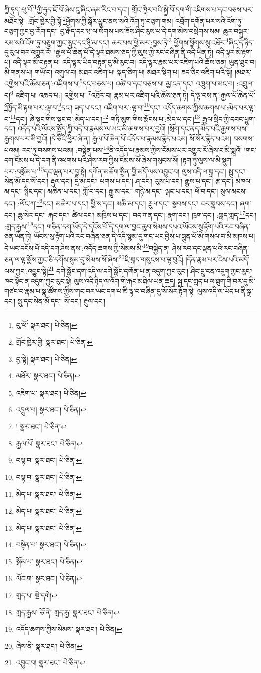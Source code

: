 ཀྱི་ཧུད་:ཕུ་བོ་\footnote{བུ་ཕོ་  སྣར་ཐང་།  པེ་ཅིན། }ཀྱི་ཧུད་ཇོ་བོ་ཞེས་ངུ་ཞིང་ཞམ་རིང་བ་དང་། གྲོང་ཁྱེར་བའི་སྐྱེ་བོ་དག་གི་འཇིགས་པ་དང་བཅས་པར་མཐོང་སྟེ། :གྲོང་ཁྱེར་གྱི་ལྷོ་\footnote{གྲོང་ཁྱེར་གྱི་  སྣར་ཐང་།  པེ་ཅིན། }ཕྱོགས་ཀྱི་སྒོར་ཕྱུང་ནས་སའི་འོག་ཏུ་བཅུག་གམ། འབྲོག་དགོན་པར་སའི་འོག་ཏུ་བཅུག་ཀྱང་བྱ་རོག་དང་། བྱ་རྒོད་དང་ཝ་ལ་སོགས་པས་ཟོས་ཤིང་རུས་པ་དེ་དག་མེས་བསྲེགས་སམ། ཆུར་བསྐུར་རམ་སའི་འོག་ཏུ་བཅུག་ཀྱང་རླུང་དང་ཉི་མ་དང་། ཆར་པས་ཕྱེ་མར་:བྱས་ཏེ།\footnote{བྱ་སྟེ།  སྣར་ཐང་།  པེ་ཅིན། } ཕྱོགས་ཕྱོགས་སུ་འཐོར་\footnote{མཐོར་  སྣར་ཐང་།  པེ་ཅིན། }ཞིང་དེ་ཉིད་དུ་རུལ་བར་འགྱུར་རོ། །རྒྱལ་པོ་ཆེན་པོ་དེ་ལྟར་ཐམས་ཅད་ཀྱི་ལུས་ཀྱི་རང་བཞིན་ནི་འདི་ཡིན་ཏེ། འདི་ལྟར་མི་རྟག་པ། འདི་ལྟར་མི་བརྟན་པ། འདི་ལྟར་ཡིད་བརྟན་དུ་མི་རུང་བ། འདི་ལྟར་རྣམ་པར་འཇིག་པའི་ཆོས་ཅན། ཡུན་ཐུང་བ། མི་གནས་པ། གཡོ་བ། འགུལ་བ། མཐར་འཇིག་པ། སྐད་ཅིག་པ། མཐར་སྡིག་པ། ཟད་ཅིང་འཇིག་པའི་སྒོ། །མཐར་འགྱེས་པའི་ཆོས་ཅན་:འཇིགས་པ་\footnote{འཇིག་པ་  སྣར་ཐང་།  པེ་ཅིན། }དང་བཅས་པ། འཚེ་བ་དང་བཅས་པ། མྱ་ངན་དང་། འཁྲུག་པ་མང་བ། :འབྲུལ་བ།\footnote{འདྲུལ་པ།  སྣར་ཐང་།  པེ་ཅིན། } འཇིག་པ། འཆད་པ:། འགྱེས་པ། \footnote{།    སྣར་ཐང་།  པེ་ཅིན། }འཐོར་བ། རྣམ་པར་འཇིག་པའི་ཆོས་ཅན་ཏེ། དེ་ལྟ་བས་ན་:རྒྱལ་པོ་ཆེན་པོ་\footnote{རྒྱལ་པོ་  སྣར་ཐང་།  པེ་ཅིན། }ཁྱོད་མི་རྟག་པར་:ལྟ་བ་\footnote{བལྟ་བ་  སྣར་ཐང་།  པེ་ཅིན། }དང་། ཟད་པ་དང་། འཇིག་པར་:ལྟ་བ་\footnote{བལྟ་བ་  སྣར་ཐང་།  པེ་ཅིན། }དང་། འདོད་ཆགས་ཀྱིས་ཆགས་པ་:མེད་པར་ལྟ་བ་\footnote{མེད་པ་  སྣར་ཐང་།  པེ་ཅིན། }དང་། ཞེ་སྡང་གིས་སྡང་བ་:མེད་པ་དང་།\footnote{མེད་པ།  སྣར་ཐང་།  པེ་ཅིན། } གཏི་མུག་གིས་རྨོངས་པ་:མེད་པ་དང་།\footnote{མེད་པ།  སྣར་ཐང་།  པེ་ཅིན། } རྒྱལ་སྲིད་ཀྱི་དབང་ཕྱུག་དང་། འདོད་པའི་ལོངས་སྤྱོད་ཀྱི་བདེ་བ་རྣམས་ལ་ཡང་མི་ཆགས་པར་བྱའོ། །སྲོག་དང་ནད་མེད་པའི་རྒྱགས་པས་རྒྱགས་པར་མི་བྱའོ། །དེ་ཅིའི་ཕྱིར་ཞེ་ན། རྒྱལ་པོ་ཆེན་པོ་འདོད་པ་རྣམས་རྙེད་པའམ། སོ་སོར་རྙེད་པའམ། བསགས་པའམ། རབ་ཏུ་བསགས་པའམ། :བསྟེན་པས་\footnote{བསྟེན་པ་  སྣར་ཐང་།  པེ་ཅིན། }ནི་འདོད་པ་རྣམས་ཀྱིས་ངོམས་པར་འགྱུར་རོ་ཞེས་ང་མི་སྨྲའོ། །གང་དག་ངོམས་པ་དེ་དག་ནི་འཕགས་པའི་ཤེས་རབ་ཀྱིས་ངོམས་སོ་ཞེས་གསུངས་སོ། །རྟག་ཏུ་ལུས་ལ་མི་སྡུག་པར་:བསྒོམ་པ་\footnote{སྒོམ་པ་  སྣར་ཐང་།  པེ་ཅིན། }དང་ལྡན་པར་བྱ་སྟེ། དཀོན་མཆོག་སྤྲིན་གྱི་མདོ་ལས་འབྱུང་བ། ལུས་འདི་ལ་སྐྲ་དང་། སྤུ་དང་། སེན་མོ་དང་སོ་དང་། རྡུལ་དང་། དྲི་མ་དང་། པགས་པ་དང་། ཤ་དང་། རུས་པ་དང་། རྒྱུས་པ་དང་། རྩ་དང་། མཁལ་མ་དང་། སྙིང་དང་། མཆིན་པ་དང་། གློ་བ་དང་། རྒྱུ་མ་དང་། གཉེ་མ་དང་། ལྒང་པ་དང་། ཕོ་བ་དང་། སུལ་མངས་དང་། :ལོང་ཀ་\footnote{ལོང་ག་  སྣར་ཐང་།  པེ་ཅིན། }དང་། མཆེར་པ་དང་། ཕྱི་ས་དང་། མཆི་མ་དང་། རྔུལ་དང་། སྣབས་དང་། ངར་སྣབས་དང་། ཞག་དང་། ཆུ་སེར་དང་། རྐང་དང་། ཚིལ་དང་། མཁྲིས་པ་དང་། བད་ཀན་དང་། རྣག་དང་། ཁྲག་དང་། :གླད་ཀླད་\footnote{གླད་པ་  སྡེ་དགེ། }དང་། :གླད་རྒྱས་\footnote{ཀླད་རྒྱས་  ཅོ་ནེ། ཀླད་རྒྱ་  སྣར་ཐང་།  པེ་ཅིན། }དང་། གཅིན་དག་ཡོད་དེ་དངོས་པོ་དེ་དག་ལ་བྱང་ཆུབ་སེམས་དཔའ་ཡོངས་སུ་རྟོག་པའི་རང་བཞིན་ཅན་ཡིན་ཏེ། ཡོངས་སུ་རྟོག་པའི་རང་བཞིན་ཅན་དེ་འདི་སྙམ་དུ་གང་ཡང་བྱིས་པ་བླུན་པོ་མི་གསལ་བ་མི་མཁས་པ། དེ་ཡང་དངོས་པོ་འདི་དག་ཤེས་ནས་:འདོད་ཆགས་ཀྱི་སེམས་མི་\footnote{འདོད་ཆགས་ཀྱིས་སེམས་  སྣར་ཐང་།  པེ་ཅིན། }བསྐྱེད་ན། ཤེས་རབ་དང་ལྡན་པའི་རང་བཞིན་ཅན་ལ་ལྟ་སྨོས་ཀྱང་ཅི་དགོས་སྙམ་དུ་སེམས་སོ་ཞེས་\footnote{ཞེས་ནི་  སྣར་ཐང་།  པེ་ཅིན། }ཇི་སྐད་གསུངས་པ་ལྟ་བུའོ། །དོན་རྣམ་པར་ངེས་པའི་མདོ་ལས་ཀྱང་:འབྱུང་སྟེ།\footnote{འབྱུང་བ།  སྣར་ཐང་།  པེ་ཅིན། } དགེ་སློང་དག་འདི་ལ་དགེ་སློང་དགོན་པ་ན་འདུག་ཀྱང་རུང་། ཤིང་དྲུ་ངན་འདུག་ཀྱང་རུང་། ཁང་སྟོང་ན་འདུག་ཀྱང་རུང་སྟེ། ལུས་འདི་ཉིད་ལ་འོག་གི་རྐང་མཐིལ་ཡན་ཆད། སྐྲ་དང་ཀླད་པ་ལ་ཐུག་གི་བར་དུ་མི་གཙང་བ་རྣམ་པ་སྣ་ཚོགས་ཀྱིས་གང་བར་ཡང་དག་པ་ཇི་ལྟ་བ་བཞིན་དུ་སོ་སོར་རྟོག་སྟེ། ལུས་འདི་ལ་ཡོད་པ་ནི་སྐྲ་དང་། སྤུ་དང་སེན་མོ་དང་། སོ་དང་། རྔུལ་དང་། 